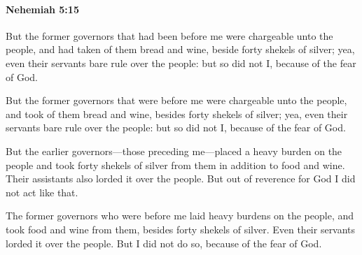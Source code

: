 		\paragraph{Nehemiah 5:15} %
			\label{NEHEMIAH-5-15}

			But the former governors that had been before me were chargeable unto the people, and had taken of them bread and wine, beside forty shekels of silver; yea, even their servants bare rule over the people: but so did not I, because of the fear of God.

			\begin{versebox}
					\item[BHS] 
					\item[LXX] 
					\item[ASV] But the former governors that were before me were chargeable unto the people, and took of them bread and wine, besides forty shekels of silver; yea, even their servants bare rule over the people: but so did not I, because of the fear of God.
					\item[NIV] But the earlier governors—those preceding me—placed a heavy burden on the people and took forty shekels of silver from them in addition to food and wine. Their assistants also lorded it over the people. But out of reverence for God I did not act like that.
					\item[NRSV] The former governors who were before me laid heavy burdens on the people, and took food and wine from them, besides forty shekels of silver. Even their servants lorded it over the people. But I did not do so, because of the fear of God.
			\end{versebox}

